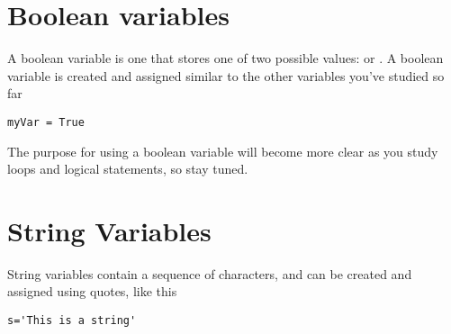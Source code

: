 \section{Boolean variables}
A boolean variable is one that stores one of two possible values: 
or .  A boolean variable is created and assigned similar to the
other variables you've studied so far
\begin{Verbatim}
myVar = True
\end{Verbatim}
The purpose for using a boolean variable will become more clear as you
study loops and logical statements, so stay tuned.
\section{String Variables}
 String variables contain a sequence of characters, and
can be created and assigned using quotes, like this
\begin{Verbatim}
s='This is a string'
\end{Verbatim}

